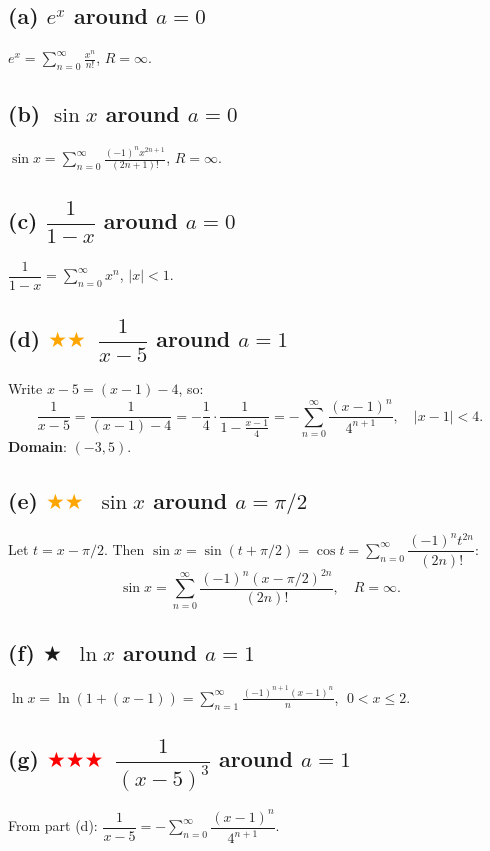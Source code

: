 \documentclass[12pt,a4paper]{article}
\newcommand{\easy}{\textcolor{green!60!black}{$\bigstar$}}
\newcommand{\medium}{\textcolor{orange}{$\bigstar\bigstar$}}
\newcommand{\hard}{\textcolor{red}{$\bigstar\bigstar\bigstar$}}
\begin{document}
\subsection*{(a) $e^x$ around $a=0$}
$e^x = \displaystyle\sum_{n=0}^{\infty}\frac{x^n}{n!}$, $R=\infty$.

\subsection*{(b) $\sin x$ around $a=0$}
$\sin x = \displaystyle\sum_{n=0}^{\infty}\frac{(-1)^n x^{2n+1}}{(2n+1)!}$, $R=\infty$.

\subsection*{(c) $\dfrac{1}{1-x}$ around $a=0$}
$\dfrac{1}{1-x} = \displaystyle\sum_{n=0}^{\infty} x^n$, $|x|<1$.

\subsection*{(d) \medium\ $\dfrac{1}{x-5}$ around $a=1$}

Write $x-5=(x-1)-4$, so:
\[
  \frac{1}{x-5}=\frac{1}{(x-1)-4}=-\frac{1}{4}\cdot\frac{1}{1-\frac{x-1}{4}}
  =-\sum_{n=0}^{\infty}\frac{(x-1)^n}{4^{n+1}}, \quad |x-1|<4.
\]
\textbf{Domain}: $(-3, 5)$.

\subsection*{(e) \medium\ $\sin x$ around $a=\pi/2$}

Let $t=x-\pi/2$.  Then $\sin x=\sin(t+\pi/2)=\cos t=\sum_{n=0}^{\infty}\dfrac{(-1)^n t^{2n}}{(2n)!}$:
\[
  \sin x = \sum_{n=0}^{\infty}\frac{(-1)^n(x-\pi/2)^{2n}}{(2n)!}, \quad R=\infty.
\]

\subsection*{(f) \easy\ $\ln x$ around $a=1$}

$\ln x = \ln(1+(x-1)) = \displaystyle\sum_{n=1}^{\infty}\frac{(-1)^{n+1}(x-1)^n}{n}$, $\;0 < x \leq 2$.

\subsection*{(g) \hard\ $\dfrac{1}{(x-5)^3}$ around $a=1$}

From part (d): $\dfrac{1}{x-5}=-\sum_{n=0}^{\infty}\dfrac{(x-1)^n}{4^{n+1}}$.
\end{document}
